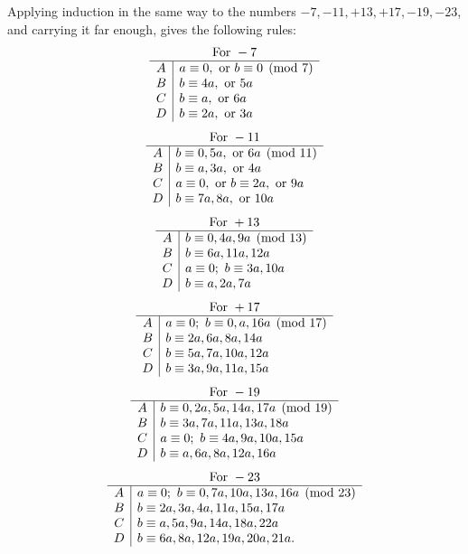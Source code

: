\documentclass[12pt]{article}
\begin{document}
Applying induction in the same way to the numbers $-7,-11,+13,+17,-19,-23$, and carrying it far enough, gives the following rules:
\[
\begin{array}{c|l}
\multicolumn{2}{c}{\text{For }-7}\\\hline
A& a\equiv0,\ \text{or }b\equiv0\pmod7\\
B& b\equiv4a,\ \text{or }5a\\
C& b\equiv a,\ \text{or }6a\\
D& b\equiv2a,\ \text{or }3a
\end{array}
\]
\[
\begin{array}{c|l}
\multicolumn{2}{c}{\text{For }-11}\\\hline
A& b\equiv0,5a,\ \text{or }6a\pmod{11}\\
B& b\equiv a,3a,\ \text{or }4a\\
C& a\equiv0,\ \text{or }b\equiv2a,\ \text{or }9a\\
D& b\equiv7a,8a,\ \text{or }10a
\end{array}
\]
\[
\begin{array}{c|l}
\multicolumn{2}{c}{\text{For }+13}\\\hline
A& b\equiv0,4a,9a\pmod{13}\\
B& b\equiv6a,11a,12a\\
C& a\equiv0;\ b\equiv3a,10a\\
D& b\equiv a,2a,7a
\end{array}
\]
\[
\begin{array}{c|l}
\multicolumn{2}{c}{\text{For }+17}\\\hline
A& a\equiv0;\ b\equiv0,a,16a\pmod{17}\\
B& b\equiv2a,6a,8a,14a\\
C& b\equiv5a,7a,10a,12a\\
D& b\equiv3a,9a,11a,15a
\end{array}
\]
\[
\begin{array}{c|l}
\multicolumn{2}{c}{\text{For }-19}\\\hline
A& b\equiv0,2a,5a,14a,17a\pmod{19}\\
B& b\equiv3a,7a,11a,13a,18a\\
C& a\equiv0;\ b\equiv4a,9a,10a,15a\\
D& b\equiv a,6a,8a,12a,16a
\end{array}
\]
\[
\begin{array}{c|l}
\multicolumn{2}{c}{\text{For }-23}\\\hline
A& a\equiv0;\ b\equiv0,7a,10a,13a,16a\pmod{23}\\
B& b\equiv2a,3a,4a,11a,15a,17a\\
C& b\equiv a,5a,9a,14a,18a,22a\\
D& b\equiv6a,8a,12a,19a,20a,21a.
\end{array}
\]
\end{document}
